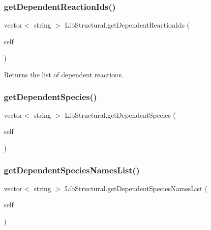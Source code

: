 \subsubsection{\texorpdfstring{get\+Dependent\+Reaction\+Ids()}{getDependentReactionIds()}}
{\footnotesize\ttfamily vector$<$ string $>$ Lib\+Structural.\+get\+Dependent\+Reaction\+Ids (\begin{DoxyParamCaption}\item[{}]{self }\end{DoxyParamCaption})}



Returns the list of dependent reactions. 

\mbox{\label{classstructural_1_1_lib_structural_a4c8ac4fd15963f52ddd713409927a0cf}} 
\subsubsection{\texorpdfstring{get\+Dependent\+Species()}{getDependentSpecies()}}
{\footnotesize\ttfamily vector$<$ string $>$ Lib\+Structural.\+get\+Dependent\+Species (\begin{DoxyParamCaption}\item[{}]{self }\end{DoxyParamCaption})}

\mbox{\label{classstructural_1_1_lib_structural_a3bd612a623b126eeb5100977c1f978ce}} 
\subsubsection{\texorpdfstring{get\+Dependent\+Species\+Names\+List()}{getDependentSpeciesNamesList()}}
{\footnotesize\ttfamily vector$<$ string $>$ Lib\+Structural.\+get\+Dependent\+Species\+Names\+List (\begin{DoxyParamCaption}\item[{}]{self }\end{DoxyParamCaption})}


